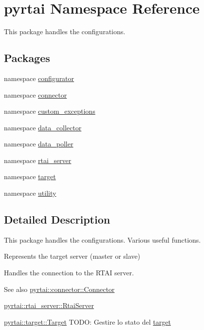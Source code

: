 \hypertarget{namespacepyrtai}{
\section{pyrtai \-Namespace \-Reference}
\label{namespacepyrtai}
}


\-This package handles the configurations.  


\subsection*{\-Packages}
\begin{DoxyCompactItemize}
\item 
namespace \hyperlink{namespacepyrtai_1_1configurator}{configurator}
\item 
namespace \hyperlink{namespacepyrtai_1_1connector}{connector}
\item 
namespace \hyperlink{namespacepyrtai_1_1custom__exceptions}{custom\-\_\-exceptions}
\item 
namespace \hyperlink{namespacepyrtai_1_1data__collector}{data\-\_\-collector}
\item 
namespace \hyperlink{namespacepyrtai_1_1data__poller}{data\-\_\-poller}
\item 
namespace \hyperlink{namespacepyrtai_1_1rtai__server}{rtai\-\_\-server}
\item 
namespace \hyperlink{namespacepyrtai_1_1target}{target}
\item 
namespace \hyperlink{namespacepyrtai_1_1utility}{utility}
\end{DoxyCompactItemize}


\subsection{\-Detailed \-Description}
\-This package handles the configurations. \-Various useful functions.

\-Represents the target server (master or slave)

\-Handles the connection to the \-R\-T\-A\-I server.

\begin{DoxySeeAlso}{\-See also}
\hyperlink{classpyrtai_1_1connector_1_1_connector}{pyrtai\-::connector\-::\-Connector}

\hyperlink{classpyrtai_1_1rtai__server_1_1_rtai_server}{pyrtai\-::rtai\-\_\-server\-::\-Rtai\-Server}

\hyperlink{classpyrtai_1_1target_1_1_target}{pyrtai\-::target\-::\-Target} \-T\-O\-D\-O\-: \-Gestire lo stato del \hyperlink{namespacepyrtai_1_1target}{target} 
\end{DoxySeeAlso}
